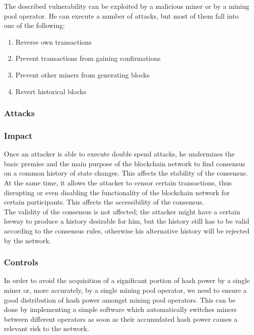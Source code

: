 \documentclass[11pt,a4paper,draft]{article}
\begin{document}
The described vulnerability can be exploited by a malicious miner or by a mining pool operator. He can execute a number of attacks, but most of them fall into one of the following:
\begin{enumerate}
  \item Reverse own transactions
  \item Prevent transactions from gaining confirmations
  \item Prevent other miners from generating blocks
  \item Revert historical blocks
\end{enumerate}

\subsubsection{Attacks}

\subsubsection{Impact}

Once an attacker is able to execute double spend attacks, he undermines the basic premise and the main purpose of the blockchain network to find consensus on a common history of state changes. This affects the stability of the consensus.\\

At the same time, it allows the attacker to censor certain transactions, thus disrupting or even disabling the functionality of the blockchain network for certain participants. This affects the accessibility of the consensus.\\

The validity of the consensus is not affected; the attacker might have a certain leeway to produce a history desirable for him, but the history still has to be valid according to the consensus rules, otherwise his alternative history will be rejected by the network.\\

\subsubsection{Controls}

In order to avoid the acquisition of a significant portion of hash power by a single miner or, more accurately, by a single mining pool operator, we need to ensure a good distribution of hash power amongst mining pool operators. This can be done by implementing a simple software which automatically switches miners between different operators as soon as their accumulated hash power causes a relevant risk to the network.\\
\end{document}
